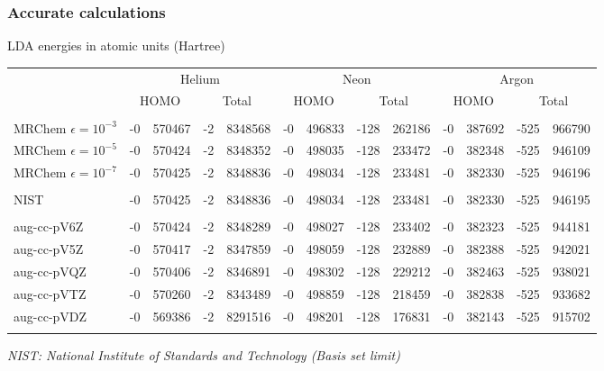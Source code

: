 \documentclass[mathserif, 10pt]{beamer}
\begin{document}
\begin{frame}
    \frametitle{Accurate calculations}
    \centering
    LDA energies in atomic units (Hartree)
    \begin{table}
	\tiny
	\centering
        \begin{tabular}{lr@{.}lr@{.}lr@{.}lr@{.}lr@{.}lr@{.}l}
	    \hline
	    \hline
	    &
	    \multicolumn{4}{c}{Helium}&\multicolumn{4}{c}{Neon}&\multicolumn{4}{c}{Argon}\\
	    &
	    \multicolumn{2}{c}{HOMO}&\multicolumn{2}{c}{Total}&
	    \multicolumn{2}{c}{HOMO}&\multicolumn{2}{c}{Total}&
	    \multicolumn{2}{c}{HOMO}&\multicolumn{2}{c}{Total}\\
	    \hline
	    &\multicolumn{4}{c}{}&\multicolumn{4}{c}{}&\multicolumn{4}{c}{}\\
	    MRChem $\epsilon=10^{-3}$&	-0&570467&-2&8348568&-0&496833&-128&262186&-0&387692&-525&966790\\
	    MRChem $\epsilon=10^{-5}$&	-0&570424&-2&8348352&-0&498035&-128&233472&-0&382348&-525&946109\\
	    MRChem $\epsilon=10^{-7}$&	-0&570425&-2&8348836&-0&498034&-128&233481&-0&382330&-525&946196\\
	    &\multicolumn{4}{c}{}&\multicolumn{4}{c}{}&\multicolumn{4}{c}{}\\
	    NIST&			-0&570425&-2&8348836&-0&498034&-128&233481&-0&382330&-525&946195\\
	    &\multicolumn{4}{c}{}&\multicolumn{4}{c}{}&\multicolumn{4}{c}{}\\
	    aug-cc-pV6Z&		-0&570424&-2&8348289&-0&498027&-128&233402&-0&382323&-525&944181\\
	    aug-cc-pV5Z&		-0&570417&-2&8347859&-0&498059&-128&232889&-0&382388&-525&942021\\
	    aug-cc-pVQZ&		-0&570406&-2&8346891&-0&498302&-128&229212&-0&382463&-525&938021\\
	    aug-cc-pVTZ&		-0&570260&-2&8343489&-0&498859&-128&218459&-0&382838&-525&933682\\
	    aug-cc-pVDZ&		-0&569386&-2&8291516&-0&498201&-128&176831&-0&382143&-525&915702\\
	    &\multicolumn{4}{c}{}&\multicolumn{4}{c}{}&\multicolumn{4}{c}{}\\
	    \hline
	    \hline
	\end{tabular}
    \end{table}
    \tiny
    \it{NIST: National Institute of Standards and Technology (Basis set limit)}\\
\end{frame}
\end{document}
